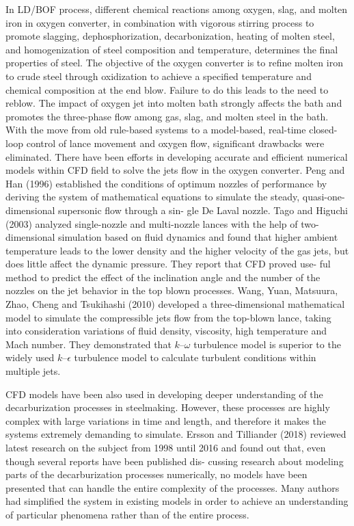 In LD/BOF process, different chemical reactions among oxygen, slag, and molten iron in oxygen converter, in combination with vigorous stirring process to promote slagging, dephosphorization, decarbonization, heating of molten steel, and homogenization of steel composition and temperature, determines the final properties of steel. The objective of the oxygen converter is to refine molten iron to crude steel through oxidization to achieve a specified temperature and chemical composition at the end blow. Failure to do this leads to the need to reblow. The impact of oxygen jet into molten bath strongly affects the bath and promotes the three-phase flow among gas, slag, and molten steel in the bath. With the move from old rule-based systems to a model-based, real-time closed-loop control of lance movement and oxygen flow, significant drawbacks were eliminated. There have been efforts in developing accurate and efficient numerical models within CFD field to solve the jets flow in the oxygen converter. Peng and Han (1996) established the conditions of optimum nozzles of performance by deriving the system of mathematical equations to simulate the steady, quasi-one-dimensional supersonic flow through a sin- gle De Laval nozzle. Tago and Higuchi (2003) analyzed single-nozzle and multi-nozzle lances with the help of two-dimensional simulation based on fluid dynamics and found that higher ambient temperature leads to the lower density and the higher velocity of the gas jets, but does little affect the dynamic pressure. They report that CFD proved use- ful method to predict the effect of the inclination angle and the number of the nozzles on the jet behavior in the top blown processes. Wang, Yuan, Matsuura, Zhao, Cheng and Tsukihashi (2010) developed a three-dimensional mathematical model to simulate the compressible jets flow from the top-blown lance, taking into consideration variations of fluid density, viscosity, high temperature and Mach number. They demonstrated that $k–\omega$ turbulence model is superior to the widely used $k–\epsilon$ turbulence model to calculate turbulent conditions within multiple jets.

CFD models have been also used in developing deeper understanding of the decarburization processes in steelmaking. However, these processes are highly complex with large variations in time and length, and therefore it makes the systems extremely demanding to simulate. Ersson and Tilliander (2018) reviewed latest research on the subject from 1998 until 2016 and found out that, even though several reports have been published dis- cussing research about modeling parts of the decarburization processes numerically, no models have been presented that can handle the entire complexity of the processes. Many authors had simplified the system in existing models in order to achieve an understanding of particular phenomena rather than of the entire process.


